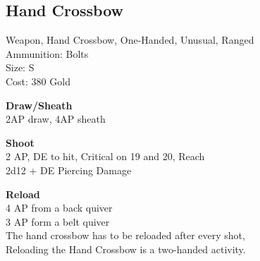 \subsection{Hand Crossbow}\label{weapon:handCrossbow}
Weapon, Hand Crossbow, One-Handed, Unusual, Ranged\\
Ammunition: Bolts\\
Size: S\\
Cost: 380 Gold

\textbf{Draw/Sheath} \\
2AP draw, 4AP sheath

\textbf{Shoot} \\
2 AP, DE to hit, Critical on 19 and 20,  Reach\\
2d12 + \texttimes DE Piercing Damage

\textbf{Reload} \\
4 AP from a back quiver\\
3 AP form a belt quiver\\
The hand crossbow has to be reloaded after every shot,\\
Reloading the Hand Crossbow is a two-handed activity.
